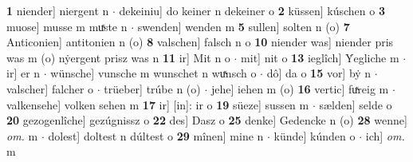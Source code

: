 \documentclass[8pt,a4paper,notitlepage]{article}
\begin{document}
\begin{table}[ht]
\begin{minipage}[t]{0.5\linewidth}
\textbf{1} niender] niergent n  $\cdot$ dekeiniu] do keiner n dekeiner o \textbf{2} küssen] kúschen o \textbf{3} muose] musse m muͯste n  $\cdot$ swenden] wenden m \textbf{5} sullen] solten n (o) \textbf{7} Anticonien] antitonien n (o) \textbf{8} valschen] falsch n o \textbf{10} niender was] niender pris was m (o) nẏergent prisz was n \textbf{11} ir] Mit n o  $\cdot$ mit] nit o \textbf{13} ieglîch] Ẏegliche m  $\cdot$ ir] er n  $\cdot$ wünsche] vunsche m wunschet n wuͯnsch o  $\cdot$ dô] da o \textbf{15} vor] bẏ n  $\cdot$ valscher] falcher o  $\cdot$ trüeber] trúbe n (o)  $\cdot$ jehe] iehen m (o) \textbf{16} vertic] fuͯreig m  $\cdot$ valkensehe] volken sehen m \textbf{17} ir] [in]: ir o \textbf{19} süeze] sussen m  $\cdot$ sælden] selde o \textbf{20} gezogenlîche] gezúgnissz o \textbf{22} des] Dasz o \textbf{25} denke] Gedencke n (o) \textbf{28} wenne] \textit{om.} m  $\cdot$ dolest] doltest n dúltest o \textbf{29} mînen] mine n  $\cdot$ künde] kúnden o  $\cdot$ ich] \textit{om.} m \newline
\end{minipage}
\end{table}
\newpage
\end{document}
